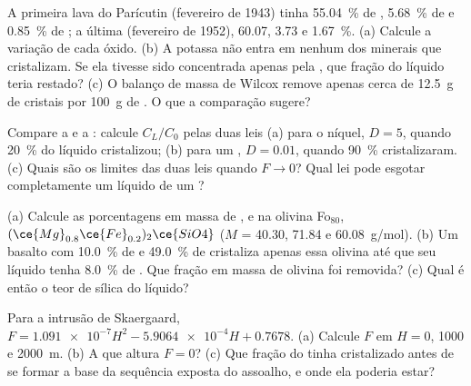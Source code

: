 \begin{exercise}[$\star$]\label{exo:b2:magmatic-differentiation:4}
A primeira lava do Parícutin (fevereiro de 1943) tinha \qty{55.04}{\percent} de ,
\qty{5.68}{\percent} de  e \qty{0.85}{\percent} de ; a última (fevereiro de
1952), 60.07, 3.73 e \qty{1.67}{\percent}. (a) Calcule a variação de cada óxido.
(b) A potassa não entra em nenhum dos minerais que cristalizam. Se ela tivesse sido concentrada apenas
pela , que fração do líquido teria restado?
(c) O balanço de massa de Wilcox remove apenas cerca de \qty{12.5}{g} de cristais por
\qty{100}{g} de . O que a comparação sugere?
\end{exercise}

\begin{exercise}[$\star\star$]\label{exo:b2:magmatic-differentiation:5}
Compare a  e a : calcule $C_L/C_0$ pelas duas leis
(a) para o níquel, $D = 5$, quando \qty{20}{\percent} do líquido cristalizou; (b)
para um , $D = 0.01$, quando \qty{90}{\percent} cristalizaram.
(c) Quais são os limites das duas leis quando $F \to 0$? Qual lei pode esgotar completamente um líquido de um
?
\end{exercise}

\begin{exercise}[$\star\star$]\label{exo:b2:magmatic-differentiation:6}
(a) Calcule as porcentagens em massa de ,  e  na olivina
Fo$_{80}$, $(\ce{Mg}_{0.8}\ce{Fe}_{0.2})_2\ce{SiO4}$ ($M$ = 40.30, 71.84 e
\qty{60.08}{g/mol}). (b) Um basalto com \qty{10.0}{\percent} de  e
\qty{49.0}{\percent} de  cristaliza apenas essa olivina até que seu líquido tenha
\qty{8.0}{\percent} de . Que fração em massa de olivina foi removida? (c) Qual
é então o teor de sílica do líquido?
\end{exercise}

\begin{exercise}[$\star\star$]\label{exo:b2:magmatic-differentiation:7}
Para a intrusão de Skaergaard, $F = \num{1.091e-7}H^2 - \num{5.9064e-4}H + 0.7678$.
(a) Calcule $F$ em $H = 0$, 1000 e \qty{2000}{m}. (b) A que altura $F = 0$?
(c) Que fração do  tinha cristalizado antes de se formar a base da sequência exposta do
assoalho, e onde ela poderia estar?
\end{exercise}

